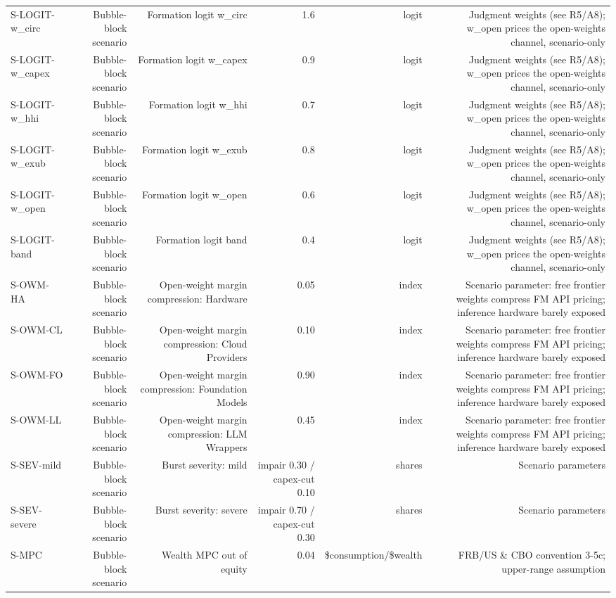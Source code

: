 \begin{tabular}{@{}lrrrrr@{}}
S-LOGIT-w\_circ & Bubble-block scenario & Formation logit w\_circ & 1.6 & logit & Judgment weights (see R5/A8); w\_open prices the open-weights channel, scenario-only \\
S-LOGIT-w\_capex & Bubble-block scenario & Formation logit w\_capex & 0.9 & logit & Judgment weights (see R5/A8); w\_open prices the open-weights channel, scenario-only \\
S-LOGIT-w\_hhi & Bubble-block scenario & Formation logit w\_hhi & 0.7 & logit & Judgment weights (see R5/A8); w\_open prices the open-weights channel, scenario-only \\
S-LOGIT-w\_exub & Bubble-block scenario & Formation logit w\_exub & 0.8 & logit & Judgment weights (see R5/A8); w\_open prices the open-weights channel, scenario-only \\
S-LOGIT-w\_open & Bubble-block scenario & Formation logit w\_open & 0.6 & logit & Judgment weights (see R5/A8); w\_open prices the open-weights channel, scenario-only \\
S-LOGIT-band & Bubble-block scenario & Formation logit band & 0.4 & logit & Judgment weights (see R5/A8); w\_open prices the open-weights channel, scenario-only \\
S-OWM-HA & Bubble-block scenario & Open-weight margin compression: Hardware & 0.05 & index & Scenario parameter: free frontier weights compress FM API pricing; inference hardware barely exposed \\
S-OWM-CL & Bubble-block scenario & Open-weight margin compression: Cloud Providers & 0.10 & index & Scenario parameter: free frontier weights compress FM API pricing; inference hardware barely exposed \\
S-OWM-FO & Bubble-block scenario & Open-weight margin compression: Foundation Models & 0.90 & index & Scenario parameter: free frontier weights compress FM API pricing; inference hardware barely exposed \\
S-OWM-LL & Bubble-block scenario & Open-weight margin compression: LLM Wrappers & 0.45 & index & Scenario parameter: free frontier weights compress FM API pricing; inference hardware barely exposed \\
S-SEV-mild & Bubble-block scenario & Burst severity: mild & impair 0.30 / capex-cut 0.10 & shares & Scenario parameters \\
S-SEV-severe & Bubble-block scenario & Burst severity: severe & impair 0.70 / capex-cut 0.30 & shares & Scenario parameters \\
S-MPC & Bubble-block scenario & Wealth MPC out of equity & 0.04 & \$consumption/\$wealth & FRB/US \& CBO convention 3-5c; upper-range assumption \\

\end{tabular}
